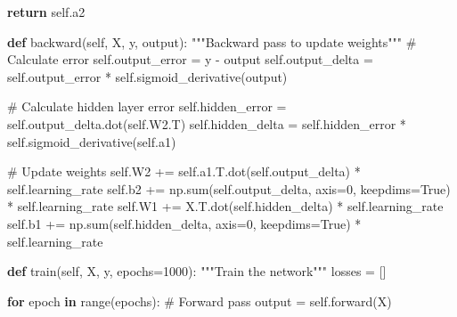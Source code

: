 \documentclass[
  letterpaper,
  DIV=11,
  numbers=noendperiod]{scrreprt}
\newenvironment{Shaded}{\begin{snugshade}}{\end{snugshade}}
\newcommand{\BuiltInTok}[1]{\textcolor[rgb]{0.00,0.23,0.31}{#1}}
\newcommand{\CommentTok}[1]{\textcolor[rgb]{0.37,0.37,0.37}{#1}}
\newcommand{\ControlFlowTok}[1]{\textcolor[rgb]{0.00,0.23,0.31}{\textbf{#1}}}
\newcommand{\DecValTok}[1]{\textcolor[rgb]{0.68,0.00,0.00}{#1}}
\newcommand{\KeywordTok}[1]{\textcolor[rgb]{0.00,0.23,0.31}{\textbf{#1}}}
\newcommand{\NormalTok}[1]{\textcolor[rgb]{0.00,0.23,0.31}{#1}}
\newcommand{\OperatorTok}[1]{\textcolor[rgb]{0.37,0.37,0.37}{#1}}
\newcommand{\VariableTok}[1]{\textcolor[rgb]{0.07,0.07,0.07}{#1}}
\begin{document}
\begin{Shaded}
\begin{Highlighting}[]
        \ControlFlowTok{return} \VariableTok{self}\NormalTok{.a2}
    
    \KeywordTok{def}\NormalTok{ backward(}\VariableTok{self}\NormalTok{, X, y, output):}
        \CommentTok{"""Backward pass to update weights"""}
        \CommentTok{\# Calculate error}
        \VariableTok{self}\NormalTok{.output\_error }\OperatorTok{=}\NormalTok{ y }\OperatorTok{{-}}\NormalTok{ output}
        \VariableTok{self}\NormalTok{.output\_delta }\OperatorTok{=} \VariableTok{self}\NormalTok{.output\_error }\OperatorTok{*} \VariableTok{self}\NormalTok{.sigmoid\_derivative(output)}
        
        \CommentTok{\# Calculate hidden layer error}
        \VariableTok{self}\NormalTok{.hidden\_error }\OperatorTok{=} \VariableTok{self}\NormalTok{.output\_delta.dot(}\VariableTok{self}\NormalTok{.W2.T)}
        \VariableTok{self}\NormalTok{.hidden\_delta }\OperatorTok{=} \VariableTok{self}\NormalTok{.hidden\_error }\OperatorTok{*} \VariableTok{self}\NormalTok{.sigmoid\_derivative(}\VariableTok{self}\NormalTok{.a1)}
        
        \CommentTok{\# Update weights}
        \VariableTok{self}\NormalTok{.W2 }\OperatorTok{+=} \VariableTok{self}\NormalTok{.a1.T.dot(}\VariableTok{self}\NormalTok{.output\_delta) }\OperatorTok{*} \VariableTok{self}\NormalTok{.learning\_rate}
        \VariableTok{self}\NormalTok{.b2 }\OperatorTok{+=}\NormalTok{ np.}\BuiltInTok{sum}\NormalTok{(}\VariableTok{self}\NormalTok{.output\_delta, axis}\OperatorTok{=}\DecValTok{0}\NormalTok{, keepdims}\OperatorTok{=}\VariableTok{True}\NormalTok{) }\OperatorTok{*} \VariableTok{self}\NormalTok{.learning\_rate}
        \VariableTok{self}\NormalTok{.W1 }\OperatorTok{+=}\NormalTok{ X.T.dot(}\VariableTok{self}\NormalTok{.hidden\_delta) }\OperatorTok{*} \VariableTok{self}\NormalTok{.learning\_rate}
        \VariableTok{self}\NormalTok{.b1 }\OperatorTok{+=}\NormalTok{ np.}\BuiltInTok{sum}\NormalTok{(}\VariableTok{self}\NormalTok{.hidden\_delta, axis}\OperatorTok{=}\DecValTok{0}\NormalTok{, keepdims}\OperatorTok{=}\VariableTok{True}\NormalTok{) }\OperatorTok{*} \VariableTok{self}\NormalTok{.learning\_rate}
    
    \KeywordTok{def}\NormalTok{ train(}\VariableTok{self}\NormalTok{, X, y, epochs}\OperatorTok{=}\DecValTok{1000}\NormalTok{):}
        \CommentTok{"""Train the network"""}
\NormalTok{        losses }\OperatorTok{=}\NormalTok{ []}
        
        \ControlFlowTok{for}\NormalTok{ epoch }\KeywordTok{in} \BuiltInTok{range}\NormalTok{(epochs):}
            \CommentTok{\# Forward pass}
\NormalTok{            output }\OperatorTok{=} \VariableTok{self}\NormalTok{.forward(X)}
            

\end{Highlighting}
\end{Shaded}
\end{document}

